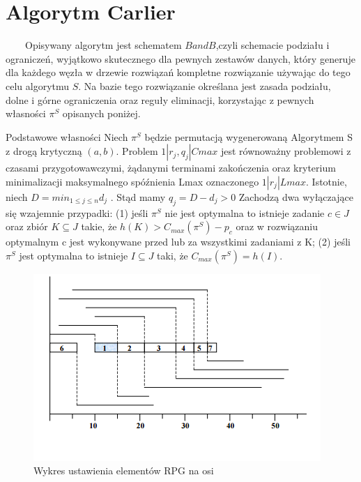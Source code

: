 \documentclass[11pt]{article}
\begin{document}
\section{Algorytm Carlier}
~~~~Opisywany algorytm jest schematem $B and B$,czyli schemacie podziału i ograniczeń, wyjątkowo skutecznego dla pewnych zestawów danych, który generuje dla każdego węzła w drzewie rozwiązań kompletne rozwiązanie używając do tego celu algorytmu $S$. Na bazie tego rozwiązanie określana jest zasada podziału, dolne i górne ograniczenia oraz reguły eliminacji, korzystając z pewnych własności $\pi^S$ opisanych poniżej. 

Podstawowe własności Niech $\pi^S$ będzie permutacją wygenerowaną Algorytmem S z drogą krytyczną $(a, b)$.
Problem $1|r_j , q_j |Cmax$ jest równoważny problemowi z czasami przygotowawczymi, żądanymi terminami zakończenia oraz kryterium minimalizacji maksymalnego spóźnienia Lmax oznaczonego $1|r_j|Lmax$. Istotnie, niech $D = min_{1\le j\le n}  d_j$ . Stąd mamy $q_j = D - d_j > 0$
 Zachodzą dwa wyłączające się wzajemnie przypadki: 
 (1) jeśli $\pi^S$ nie jest optymalna to istnieje zadanie $c \in J$ oraz zbiór $K \subseteq J$ takie, że $h(K) > C_{max}(\pi^S) - p_c$ oraz w rozwiązaniu optymalnym c jest wykonywane przed lub za wszystkimi zadaniami z K; 
 (2) jeśli $\pi^S$ jest optymalna to istnieje $I \subseteq J$ taki, że $C_{max}(\pi^S) = h(I)$.

\begin{figure}[!ht]
\centering
\includegraphics[scale=0.7]{wyk_1}
\caption{Wykres ustawienia elementów RPG na osi}
\end{figure}
\end{document}
